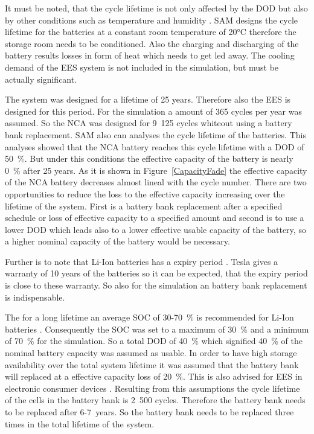 It must be noted, that the cycle lifetime is not only affected by the DOD but also by other conditions such as temperature and humidity \cite{MitElectricVehilceTeam2008}. SAM designs the cycle lifetime for the batteries at a constant room temperature of 20\si{\celsius} therefore the storage room needs to be conditioned. Also the charging and discharging of the battery results losses in form of heat which needs to get led away. The cooling demand of the EES system is not included in the simulation, but must be actually significant. \cite{Diorio2015} 



The system was designed for a lifetime of 25 years. Therefore also the EES is designed for this period. For the simulation a amount of 365 cycles per year was assumed. So the NCA was designed for 9~125 cycles whiteout using a battery bank replacement. SAM also can analyses the cycle lifetime of the batteries. This analyses showed that the NCA battery reaches this cycle lifetime with a DOD of 50~\%. But under this conditions the effective capacity of the battery is nearly 0~\% after 25 years. As it is shown in Figure~\ref{CapacityFade} the effective capacity of the NCA battery decreases almost lineal with the cycle number. There are two opportunities to reduce the loss to the effective capacity increasing over the lifetime of the system. First is a battery bank replacement after a specified schedule or loss of effective capacity to a specified amount and second is to use a lower DOD which leads also to a lower effective usable capacity of the battery, so a higher nominal capacity of the battery would be necessary.



Further is to note that Li-Ion batteries has a expiry period \cite{Jossen2006}. Tesla gives a warranty of 10 years of the batteries \cite{Shahan2015} so it can be expected, that the expiry period is close to these warranty. So also for the simulation an battery bank replacement is indispensable.



The for a long lifetime an average SOC of 30-70~\% is recommended for Li-Ion batteries \cite{Jossen2006}. Consequently the SOC was set to a maximum of 30~\% and a minimum of 70~\% for the simulation. So a total DOD of 40~\% which signified 40~\% of the nominal battery capacity was assumed as usable. In order to have high storage availability over the total system lifetime it was assumed that the battery bank will replaced at a effective capacity loss of 20~\%. This is also advised for EES in electronic consumer devices \cite{Spotnitz2003}. Resulting from this assumptions the cycle lifetime of the cells in the battery bank is 2~500 cycles. Therefore the battery bank needs to be replaced after 6-\SI{7}{years}. So the battery bank needs to be replaced three times in the total lifetime of the system. 




